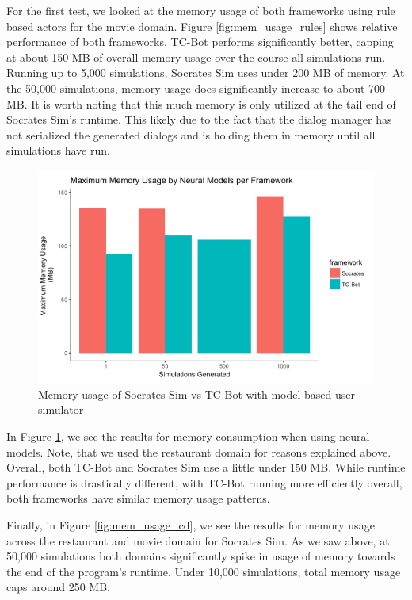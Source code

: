 For the first test, we looked at the memory usage of both frameworks using rule based actors for the movie domain. Figure \ref{fig:mem_usage_rules} shows relative performance of both frameworks. TC-Bot performs significantly better, capping at about 150 MB of overall memory usage over the course all simulations run. Running up to 5,000 simulations, Socrates Sim uses under 200 MB of memory. At the 50,000 simulations, memory usage does significantly increase to about 700 MB. It is worth noting that this much memory is only utilized at the tail end of Socrates Sim's runtime. This likely due to the fact that the dialog manager has not serialized the generated dialogs and is holding them in memory until all simulations have run.  

\begin{figure}[h!]
	\label{fig:mem_usage_nm}
	\includegraphics[width=\linewidth]{diagrams/mem_usage_neural.jpeg}
	\caption{ Memory usage of Socrates Sim vs TC-Bot with model based user simulator }
\end{figure}

In Figure \ref{fig:mem_usage_nm}, we see the results for memory consumption when using neural models. Note, that we used the restaurant domain for reasons explained above. Overall, both TC-Bot and Socrates Sim use a little under 150 MB. While runtime performance is drastically different, with TC-Bot running more efficiently overall, both frameworks have similar memory usage patterns. 

Finally, in Figure \ref{fig:mem_usage_cd}, we see the results for memory usage across the restaurant and movie domain for Socrates Sim. As we saw above, at 50,000 simulations both domains significantly spike in usage of memory towards the end of the program's runtime. Under 10,000 simulations, total memory usage caps around 250 MB. 

